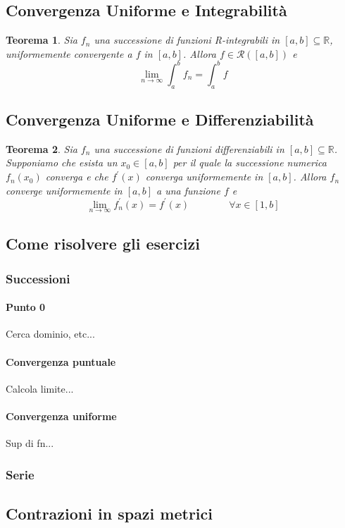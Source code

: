 \documentclass[a4paper,12pt]{article}
\newcommand{\Rint}{\mathcal{R}}
\newtheorem{teo}{Teorema}
\begin{document}
\subsection{Convergenza Uniforme e Integrabilità}
\begin{teo}
Sia ${f_n}$ una successione di funzioni R-integrabili in $[a,b]\subseteq \mathbb{R}$, uniformemente convergente a $f$ in $[a,b]$. Allora $f\in \Rint([a,b])$ e
$$\lim_{n\to\infty}\int_{a}^{b} f_n=\int_{a}^{b}f$$
\end{teo}
\subsection{Convergenza Uniforme e Differenziabilità}
\begin{teo}
Sia $f_n$ una successione di funzioni differenziabili in  $[a,b]\subseteq \mathbb{R}$. Supponiamo che esista un $x_{0} \in [a,b] $ per il quale la successione numerica ${f_n(x_0)}$ converga e che ${f^{'}(x)}$ converga uniformemente in $[a,b]$. Allora ${f_n}$ converge uniformemente in $[a,b]$ a una funzione $f$ e
$$\lim_{n\to\infty} f^{'}_n (x)=f^{'}(x) \qquad \qquad \forall x \in [1,b]$$
\end{teo}

\subsection{Come risolvere gli esercizi}
\subsubsection{Successioni}
\paragraph{Punto 0}
Cerca dominio, etc...
\paragraph{Convergenza puntuale}
Calcola limite...
\paragraph{Convergenza uniforme}
Sup di fn...

\subsubsection{Serie}


\subsection{Contrazioni in spazi metrici}
\end{document}
